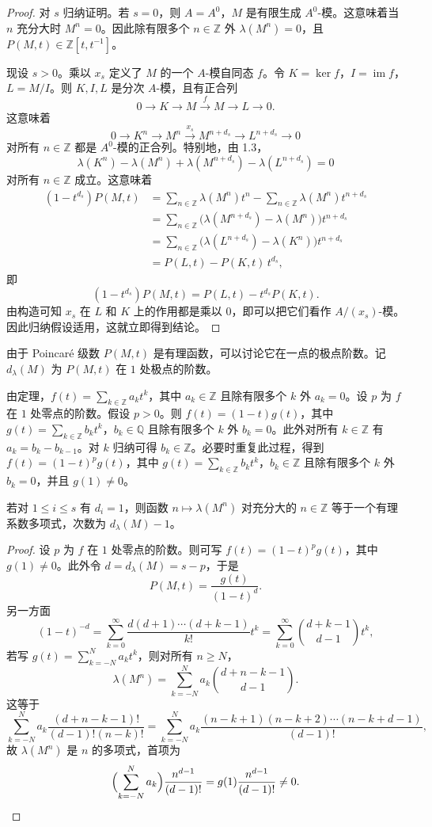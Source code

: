 \begin{proof}
对 $s$ 归纳证明。若 $s=0$，则 $A=A^0$，$M$ 是有限生成 $A^0$-模。这意味着当 $n$ 充分大时 $M^n=0$。因此除有限多个 $n\in\mathbb{Z}$ 外 $\lambda(M^n)=0$，且 $P(M,t)\in\mathbb{Z}[t,t^{-1}]$。

现设 $s>0$。乘以 $x_s$ 定义了 $M$ 的一个 $A$-模自同态 $f$。令 $K=\ker f$，$I=\operatorname{im} f$，$L=M/I$。则 $K,I,L$ 是分次 $A$-模，且有正合列
$$0\longrightarrow K\longrightarrow M\xrightarrow{\ f\ } M\longrightarrow L\longrightarrow 0.$$
这意味着
$$0\longrightarrow K^n\longrightarrow M^n\xrightarrow{\ x_s\ } M^{n+d_s}\longrightarrow L^{n+d_s}\longrightarrow 0$$
对所有 $n\in\mathbb{Z}$ 都是 $A^0$-模的正合列。特别地，由 1.3，
$$\lambda(K^n)-\lambda(M^n)+\lambda(M^{n+d_s})-\lambda(L^{n+d_s})=0$$
对所有 $n\in\mathbb{Z}$ 成立。这意味着
\begin{align*}
(1-t^{d_s})P(M,t)&=\sum_{n\in\mathbb{Z}}\lambda(M^n)t^n-\sum_{n\in\mathbb{Z}}\lambda(M^n)t^{n+d_s}\\
&=\sum_{n\in\mathbb{Z}}\bigl(\lambda(M^{n+d_s})-\lambda(M^n)\bigr)t^{n+d_s}\\
&=\sum_{n\in\mathbb{Z}}\bigl(\lambda(L^{n+d_s})-\lambda(K^n)\bigr)t^{n+d_s}\\
&=P(L,t)-P(K,t)\,t^{d_s},
\end{align*}
即
$$(1-t^{d_s})P(M,t)=P(L,t)-t^{d_s}P(K,t).$$
由构造可知 $x_s$ 在 $L$ 和 $K$ 上的作用都是乘以 $0$，即可以把它们看作 $A/(x_s)$-模。因此归纳假设适用，这就立即得到结论。
\end{proof}

由于 Poincaré 级数 $P(M,t)$ 是有理函数，可以讨论它在一点的极点阶数。记 $d_\lambda(M)$ 为 $P(M,t)$ 在 $1$ 处极点的阶数。

由定理，$f(t)=\sum_{k\in\mathbb{Z}}a_k t^k$，其中 $a_k\in\mathbb{Z}$ 且除有限多个 $k$ 外 $a_k=0$。设 $p$ 为 $f$ 在 $1$ 处零点的阶数。假设 $p>0$。则 $f(t)=(1-t)g(t)$，其中 $g(t)=\sum_{k\in\mathbb{Z}}b_k t^k$，$b_k\in\mathbb{Q}$ 且除有限多个 $k$ 外 $b_k=0$。此外对所有 $k\in\mathbb{Z}$ 有 $a_k=b_k-b_{k-1}$。对 $k$ 归纳可得 $b_k\in\mathbb{Z}$。必要时重复此过程，得到 $f(t)=(1-t)^p g(t)$，其中 $g(t)=\sum_{k\in\mathbb{Z}}b_k t^k$，$b_k\in\mathbb{Z}$ 且除有限多个 $k$ 外 $b_k=0$，并且 $g(1)\neq 0$。

\begin{corollary}
若对 $1\le i\le s$ 有 $d_i=1$，则函数 $n\longmapsto \lambda(M^n)$ 对充分大的 $n\in\mathbb{Z}$ 等于一个有理系数多项式，次数为 $d_\lambda(M)-1$。
\end{corollary}

\begin{proof}
设 $p$ 为 $f$ 在 $1$ 处零点的阶数。则可写 $f(t)=(1-t)^p g(t)$，其中 $g(1)\neq 0$。此外令 $d=d_\lambda(M)=s-p$，于是
$$P(M,t)=\frac{g(t)}{(1-t)^d}.$$
另一方面
$$(1-t)^{-d}=\sum_{k=0}^{\infty}\frac{d(d+1)\cdots(d+k-1)}{k!}t^k=\sum_{k=0}^{\infty}\binom{d+k-1}{d-1}t^k,$$
若写 $g(t)=\sum_{k=-N}^{N}a_k t^k$，则对所有 $n\ge N$，
$$\lambda(M^n)=\sum_{k=-N}^{N}a_k\binom{d+n-k-1}{d-1}.$$
这等于
$$\sum_{k=-N}^{N}a_k\frac{(d+n-k-1)!}{(d-1)!(n-k)!}
=\sum_{k=-N}^{N}a_k\frac{(n-k+1)(n-k+2)\cdots(n-k+d-1)}{(d-1)!},$$
故 $\lambda(M^n)$ 是 $n$ 的多项式，首项为
$$\Bigl(\sum_{k=-N}^{N}a_k\Bigr)\frac{n^{d-1}}{(d-1)!}=g(1)\frac{n^{d-1}}{(d-1)!}\neq 0.$$
\end{proof}

